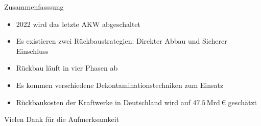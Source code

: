 \begin{frame}{Zusammenfasssung}
  \begin{itemize}
    \setlength\itemsep{1.2em}
    \item { 2022 wird das letzte AKW abgeschaltet}
    \item { Es existieren zwei Rückbaustrategien:  Direkter Abbau und Sicherer Einschluss}
    \item { Rückbau läuft in vier Phasen ab }
    \item { Es kommen verschiedene Dekontaminationstechniken zum Einsatz}
    \item { Rückbaukosten der Kraftwerke in Deutschland wird auf  $\num{47.5} \, \mathrm{Mrd} \,\euro$ geschätzt}
  \end{itemize}
\end{frame}



\begin{frame}[allowframebreaks]
  \nocite{*}
  \printbibliography
\end{frame}



\begin{frame}
  \begin{center}
  Vielen Dank für die
  Aufmerksamkeit
  \end{center}
\end{frame}




